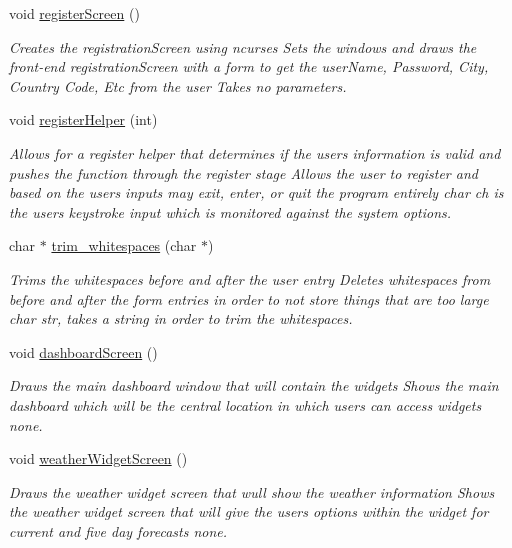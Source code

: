 \begin{DoxyCompactItemize}
void \mbox{\hyperlink{class_main_interface_a2453e08da319d026a2ef0b724b445928}{register\+Screen}} ()
\begin{DoxyCompactList}\small\item\em Creates the registration\+Screen using ncurses  Sets the windows and draws the front-\/end registration\+Screen with a form to get the user\+Name, Password, City, Country Code, Etc from the user  Takes no parameters. \end{DoxyCompactList}\item 
void \mbox{\hyperlink{class_main_interface_a4c5fbc56836bf55dda9cf809dd11f147}{register\+Helper}} (int)
\begin{DoxyCompactList}\small\item\em Allows for a register helper that determines if the user\textquotesingle{}s information is valid and pushes the function through the register stage  Allows the user to register and based on the user\textquotesingle{}s inputs may exit, enter, or quit the program entirely  char ch is the user\textquotesingle{}s keystroke input which is monitored against the system options. \end{DoxyCompactList}\item 
char $\ast$ \mbox{\hyperlink{class_main_interface_a8ab8c45d7aa780c1c8f0f6c40c15c133}{trim\+\_\+whitespaces}} (char $\ast$)
\begin{DoxyCompactList}\small\item\em Trims the whitespaces before and after the user entry  Deletes whitespaces from before and after the form entries in order to not store things that are too large  char str, takes a string in order to trim the whitespaces. \end{DoxyCompactList}\item 
void \mbox{\hyperlink{class_main_interface_a8dcd81276003c4d4693115d89da573ca}{dashboard\+Screen}} ()
\begin{DoxyCompactList}\small\item\em Draws the main dashboard window that will contain the widgets  Shows the main dashboard which will be the central location in which users can access widgets  none. \end{DoxyCompactList}\item 
void \mbox{\hyperlink{class_main_interface_ae72bd29c04edb558852887aef9d91ccf}{weather\+Widget\+Screen}} ()
\begin{DoxyCompactList}\small\item\em Draws the weather widget screen that wull show the weather information  Shows the weather widget screen that will give the users options within the widget for current and five day forecasts  none. \end{DoxyCompactList}\item 

\end{DoxyCompactItemize}
